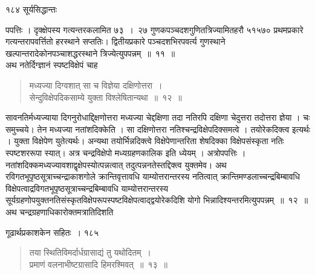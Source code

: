\documentclass[11pt, openany]{book}
\begin{document}
\newpage



\noindent १८४ \hspace{4cm} सूर्यसिद्धान्तः 
\vspace{1cm}

\begin{sloppypar}
\noindent पपत्तिः । दृक्क्षेपस्य गत्यन्तरकलामित ७३~।~२७ गुणकपञ्चदशगुणितत्रिज्यामितहरौ ५१५७० प्रथमप्रकारे गत्यन्तरापवर्त्तितो हरस्थाने सप्ततिः। द्वितीयप्रकारे पञ्चदशभिरपवर्त्य गुणस्थाने खल्पान्तरादेकोनपञ्चाशद्धरस्थाने त्रिज्येत्युपपन्नम्~॥~११~॥\\
अथ नतेर्दिग्ज्ञानं स्पष्टविक्षेपं चाह\textendash
\end{sloppypar}


\begin{quote}
  {\ssi मध्यज्या दिग्वशात् सा च विज्ञेया दक्षिणोत्तरा~।\\
 सेन्दुविक्षेपदिकसाम्ये युक्ता विश्लेषितान्यथा~॥~१२~॥}
 \end{quote}

\begin{sloppypar}
 सावनतिर्मध्यज्याया दिगनुरोधाद्द्क्षिणोत्तरा मध्यज्या चेद्दक्षिणा तदा नतिरपि दक्षिणा चेदुत्तरा तदोत्तरा ज्ञेया । चः समुच्चये। तेन मध्यज्या नतांशदिक्केति । सा दक्षिणोत्तरा नतिश्चन्द्रविक्षेपदिक्समत्वे । तयोरेकदिक्त्व इत्यर्थः । युक्ता विक्षेपेण युतेत्यर्थः। अन्यथा तयोर्भिन्नदिक्त्वे विक्षेपेणान्तरिता शेषदिक्का विक्षेपसंस्कृता नतिः स्पष्टशररूपा स्यात्। अत्र चन्द्रविक्षेपो मध्यग्रहणकालिक इति ध्येयम् । अत्रोपपत्तिः । नतांशदिक्कमध्यज्यावशाद्वृक्षेपस्योत्पन्नत्वात् तदुत्पन्ननतेस्तद्दिक्त्व युक्तमेव। अथ रविगतभूपृष्ठसूत्राच्चन्द्राकाशगोले क्रान्तिवृत्तावधि याम्योत्तरान्तरस्य नतित्वात् क्रान्तिमण्डलाच्चन्द्रबिम्बावधि विक्षेपत्वाद्रविगतभूपृष्ठसूत्राच्चन्द्रबिम्बावधि याम्योत्तरान्तरस्य सूर्यग्रहणोपयुक्तनतिसंस्कृतविक्षेपरूपस्पष्टविक्षेपत्वाद्द्वयोरेकदिशि योगो भिन्नादिश्यन्तरमित्युपपन्नम्~॥~१२~॥\\
\noindent अथ चन्द्रग्रहणाधिकारोक्तमत्रातिदिशति\textendash
\end{sloppypar}

\newpage


\hspace{3cm} गूढार्थप्रकाशकेन सहितः~। \hfill १८५
\vspace{1cm}
 

\begin{quote}
  {\ssi तया स्थितिविमर्दार्धग्रासाद्यं तु यथोदितम्~।\\
प्रमाणं वलनाभीष्टग्रासादि हिमरश्मिवत्~॥~१३~॥}
\end{quote}
\end{document}
